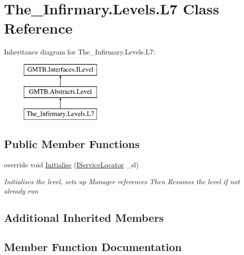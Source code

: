 \hypertarget{class_the___infirmary_1_1_levels_1_1_l7}{}\section{The\+\_\+\+Infirmary.\+Levels.\+L7 Class Reference}
\label{class_the___infirmary_1_1_levels_1_1_l7}
Inheritance diagram for The\+\_\+\+Infirmary.\+Levels.\+L7\+:\begin{figure}[H]
\begin{center}
\leavevmode
\includegraphics[height=3.000000cm]{class_the___infirmary_1_1_levels_1_1_l7}
\end{center}
\end{figure}
\subsection*{Public Member Functions}
\begin{DoxyCompactItemize}
\item 
override void \mbox{\hyperlink{class_the___infirmary_1_1_levels_1_1_l7_a349906e4400cff8ec3688537c7a40f88}{Initialise}} (\mbox{\hyperlink{interface_g_m_t_b_1_1_interfaces_1_1_i_service_locator}{I\+Service\+Locator}} \+\_\+sl)
\begin{DoxyCompactList}\small\item\em Initialises the level, sets up Manager references Then Resumes the level if not already run \end{DoxyCompactList}\end{DoxyCompactItemize}
\subsection*{Additional Inherited Members}


\subsection{Member Function Documentation}
\mbox{\label{class_the___infirmary_1_1_levels_1_1_l7_a349906e4400cff8ec3688537c7a40f88}} 
